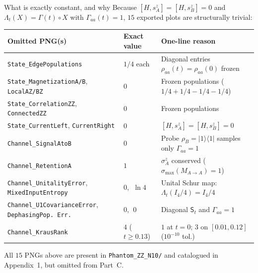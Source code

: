 \documentclass[aspectratio=169,11pt]{beamer}
\newcommand{\ket}[1]{\lvert #1\rangle}
\newcommand{\bra}[1]{\langle #1\rvert}
\newcommand{\St}{\mathsf S_t}
\newcommand{\mutednote}[1]{{\color{muted}\scriptsize #1}}
\begin{document}
\begin{frame}{What is exactly constant, and why}
\footnotesize
Because $[H,s_A^z]=[H,s_B^z]=0$ and $\Lambda_t(X)=\Gamma(t)\circ X$ with $\Gamma_{aa}(t)=1$, $15$ exported plots are structurally trivial:
\smallskip
\begin{center}
\scriptsize\setlength{\tabcolsep}{3pt}
\begin{tabular}{@{}lll@{}}
\toprule
Omitted PNG(s) & Exact value & One-line reason \\\midrule
\texttt{State\_EdgePopulations} & $1/4$ each & Diagonal entries $\rho_{aa}(t)=\rho_{aa}(0)$ frozen \\
\texttt{State\_MagnetizationA/B}, \texttt{LocalAZ/BZ} & $0$ & Frozen populations ($1/4+1/4-1/4-1/4$) \\
\texttt{State\_CorrelationZZ}, \texttt{ConnectedZZ} & $0$ & Frozen populations \\
\texttt{State\_CurrentLeft}, \texttt{CurrentRight} & $0$ & $[H,s_A^z]=[H,s_B^z]=0$ \\
\texttt{Channel\_SignalAtoB} & $0$ & Probe $\rho_B=\ket1\bra1$ samples only $\Gamma_{aa}=1$ \\
\texttt{Channel\_RetentionA} & $1$ & $\sigma_A^z$ conserved ($\sigma_{\max}(M_{A\to A})=1$) \\
\texttt{Channel\_UnitalityError}, \texttt{MixedInputEntropy} & $0$, $\;\ln 4$ & Unital Schur map: $\Lambda_t(I_4/4)=I_4/4$ \\
\texttt{Channel\_U1CovarianceError}, \texttt{DephasingPop.\,Err.} & $0$, $\;0$ & Diagonal $\St$ and $\Gamma_{aa}=1$ \\
\texttt{Channel\_KrausRank} & $4$ ($t\ge 0.13$) & $1$ at $t=0$; $3$ on $[0.01,0.12]$ ($10^{-10}$ tol.) \\\bottomrule
\end{tabular}
\end{center}
\smallskip
\mutednote{All $15$ PNGs above are present in \texttt{Phantom\_ZZ\_N10/} and catalogued in Appendix~1, but omitted from Part~C.}
\end{frame}
\end{document}
